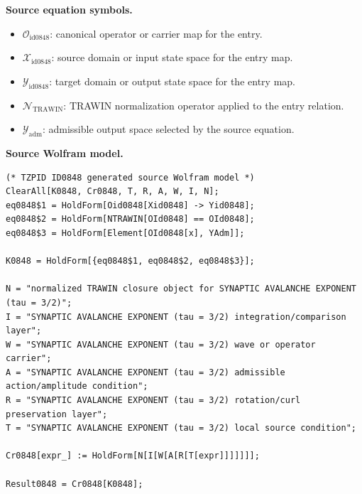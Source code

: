 \begin{minipage}[t]{0.49\linewidth}
\begingroup
\small
\raggedright
\textbf{Source equation symbols.}\par
\begin{itemize}[leftmargin=1.35em,itemsep=1pt,topsep=1pt,parsep=0pt]
    \item $\mathcal{O}_{\mathrm{id0848}}$: canonical operator or carrier map for the entry.
    \item $\mathcal{X}_{\mathrm{id0848}}$: source domain or input state space for the entry map.
    \item $\mathcal{Y}_{\mathrm{id0848}}$: target domain or output state space for the entry map.
    \item $\mathcal{N}_{\mathrm{TRAWIN}}$: TRAWIN normalization operator applied to the entry relation.
    \item $\mathcal{Y}_{\mathrm{adm}}$: admissible output space selected by the source equation.
\end{itemize}
\endgroup
\end{minipage}\hfill
\begin{minipage}[t]{0.47\linewidth}
\begingroup
\scriptsize
\raggedright
\textbf{Source Wolfram model.}\par
\begin{Verbatim}[fontsize=\tiny,breaklines=true,breakanywhere=true]
(* TZPID ID0848 generated source Wolfram model *)
ClearAll[K0848, Cr0848, T, R, A, W, I, N];
eq0848$1 = HoldForm[Oid0848[Xid0848] -> Yid0848];
eq0848$2 = HoldForm[NTRAWIN[OId0848] == OId0848];
eq0848$3 = HoldForm[Element[OId0848[x], YAdm]];

K0848 = HoldForm[{eq0848$1, eq0848$2, eq0848$3}];

N = "normalized TRAWIN closure object for SYNAPTIC AVALANCHE EXPONENT (tau = 3/2)";
I = "SYNAPTIC AVALANCHE EXPONENT (tau = 3/2) integration/comparison layer";
W = "SYNAPTIC AVALANCHE EXPONENT (tau = 3/2) wave or operator carrier";
A = "SYNAPTIC AVALANCHE EXPONENT (tau = 3/2) admissible action/amplitude condition";
R = "SYNAPTIC AVALANCHE EXPONENT (tau = 3/2) rotation/curl preservation layer";
T = "SYNAPTIC AVALANCHE EXPONENT (tau = 3/2) local source condition";

Cr0848[expr_] := HoldForm[N[I[W[A[R[T[expr]]]]]]];

Result0848 = Cr0848[K0848];
\end{Verbatim}
\endgroup
\end{minipage}

